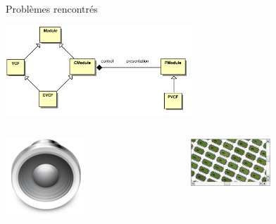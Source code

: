 \documentclass[frenchb]{beamer}
\begin{document}
\begin{frame}{Problèmes rencontrés}
    \begin{center}
        \includegraphics[width=7cm]{../img/ps/pacmodule-psm.pdf}
    \end{center}
    \pause
    \begin{columns}
        \begin{column}[l]{7cm}
        \includegraphics[width=3cm]{../img/png/arts128x128.png}
        \end{column}
        \pause
        \begin{column}[r]{4cm}
        \includegraphics[width=3cm]{../img/png/graphicsview-view.png}
        \end{column}
    \end{columns}
\end{frame}
\end{document}
